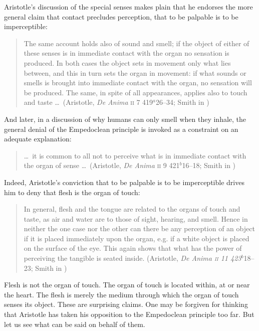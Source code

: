 Aristotle's discussion of the special senses makes plain that he endorses the more general claim that contact precludes perception, that to be palpable is to be imperceptible:
\begin{quote}
	The same account holds also of sound and smell; if the object of either of these senses is in immediate contact with the organ no sensation is produced. In both cases the object sets in movement only what lies between, and this in turn sets the organ in movement: if what sounds or smells is brought into immediate contact with the organ, no sensation will be produced. The same, in spite of all appearances, applies also to touch and taste \ldots\ (Aristotle, \emph{De Anima} \textsc{ii} 7 419\( ^{a} \)26--34; Smith in \citealt[34]{Barnes:1984uq})
\end{quote}
And later, in a discussion of why humans can only smell when they inhale, the general denial of the Empedoclean principle is invoked as a constraint on an adequate explanation:
\begin{quote}
	\ldots\ it is common to all not to perceive what is in immediate contact with the organ of sense \ldots\ (Aristotle, \emph{De Anima} \textsc{ii} 9 421\( ^{b} \)16--18; Smith in \citealt[38]{Barnes:1984uq})
\end{quote}

Indeed, Aristotle's conviction that to be palpable is to be imperceptible drives him to deny that flesh is the organ of touch:
\begin{quote}
    In general, flesh and the tongue are related to the organs of touch and taste, as air and water are to those of sight, hearing, and smell. Hence in neither the one case nor the other can there be any perception of an object if it is placed immediately upon the organ, e.g. if a white object is placed on the surface of the eye. This again shows that what has the power of perceiving the tangible is seated inside. (Aristotle, \emph{De Anima \textsc{ii} 11 423\( ^{b} \)}18--23; Smith in \citealt[42]{Barnes:1984uq})
\end{quote}
Flesh is not the organ of touch. The organ of touch is located within, at or near the heart. The flesh is merely the medium through which the organ of touch senses its object. These are surprising claims. One may be forgiven for thinking that Aristotle has taken his opposition to the Empedoclean principle too far. But let us see what can be said on behalf of them.

